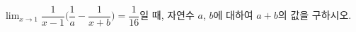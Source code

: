 $\displaystyle\lim_{x\to1}\dfrac{1}{x-1}\Big(\dfrac{1}{a}-\dfrac{1}{x+b}\Big)=\dfrac{1}{16}$일 때, 자연수 $a$, $b$에 대하여 $a+b$의 값을 구하시오.

